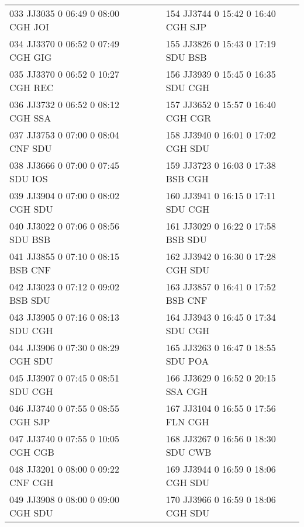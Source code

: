 \begin{scriptsize}
\begin{longtable}{l c c l}
033 JJ3035 0 06:49 0 08:00 CGH JOI & & & 154 JJ3744 0 15:42 0 16:40 CGH SJP \\

034 JJ3370 0 06:52 0 07:49 CGH GIG & & & 155 JJ3826 0 15:43 0 17:19 SDU BSB \\

035 JJ3370 0 06:52 0 10:27 CGH REC & & & 156 JJ3939 0 15:45 0 16:35 SDU CGH \\

036 JJ3732 0 06:52 0 08:12 CGH SSA & & & 157 JJ3652 0 15:57 0 16:40 CGH CGR \\

037 JJ3753 0 07:00 0 08:04 CNF SDU & & & 158 JJ3940 0 16:01 0 17:02 CGH SDU \\

038 JJ3666 0 07:00 0 07:45 SDU IOS & & & 159 JJ3723 0 16:03 0 17:38 BSB CGH \\

039 JJ3904 0 07:00 0 08:02 CGH SDU & & & 160 JJ3941 0 16:15 0 17:11 SDU CGH \\

040 JJ3022 0 07:06 0 08:56 SDU BSB & & & 161 JJ3029 0 16:22 0 17:58 BSB SDU \\

041 JJ3855 0 07:10 0 08:15 BSB CNF & & & 162 JJ3942 0 16:30 0 17:28 CGH SDU \\

042 JJ3023 0 07:12 0 09:02 BSB SDU & & & 163 JJ3857 0 16:41 0 17:52 BSB CNF \\

043 JJ3905 0 07:16 0 08:13 SDU CGH & & & 164 JJ3943 0 16:45 0 17:34 SDU CGH \\

044 JJ3906 0 07:30 0 08:29 CGH SDU & & & 165 JJ3263 0 16:47 0 18:55 SDU POA \\

045 JJ3907 0 07:45 0 08:51 SDU CGH & & & 166 JJ3629 0 16:52 0 20:15 SSA CGH \\

046 JJ3740 0 07:55 0 08:55 CGH SJP & & & 167 JJ3104 0 16:55 0 17:56 FLN CGH \\

047 JJ3740 0 07:55 0 10:05 CGH CGB & & & 168 JJ3267 0 16:56 0 18:30 SDU CWB \\

048 JJ3201 0 08:00 0 09:22 CNF CGH & & & 169 JJ3944 0 16:59 0 18:06 CGH SDU \\

049 JJ3908 0 08:00 0 09:00 CGH SDU & & & 170 JJ3966 0 16:59 0 18:06 CGH SDU \\


\end{longtable}
\end{scriptsize}
